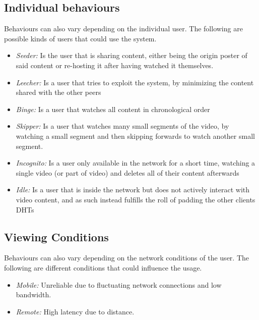 \subsection{Individual behaviours}
\label{sec:individual-behavious}
Behaviours can also vary depending on the individual user. The following are possible kinds of users that could use the system.
\begin{itemize}
    \item \textit{Seeder:}
    Is the user that is sharing content, either being the origin poster of said content or re-hosting it after having watched it themselves.
    \item \textit{Leecher:}
    Is a user that tries to exploit the system, by minimizing the content shared with the other peers %
    \item \textit{Binge:}
    Is a user that watches all content in chronological order
    \item \textit{Skipper:}
    Is a user that watches many small segments of the video, by watching a small segment and then skipping forwards to watch another small segment.
    \item \textit{Incognito:}
    Is a user only available in the network for a short time, watching a single video (or part of video) and deletes all of their content afterwards
    \item \textit{Idle:}
    Is a user that is inside the network but does not actively interact with video content, and as such instead fulfills the roll of padding the other clients \acp{DHT}
\end{itemize}

\subsection{Viewing Conditions}
\label{sec:viewing-conmditions}
Behaviours can also vary depending on the network conditions of the user. The following are different conditions that could influence the usage.
\begin{itemize}
    \item \textit{Mobile:}
    Unreliable due to fluctuating network connections and low bandwidth.
    \item \textit{Remote:}
    High latency due to distance.
\end{itemize}


